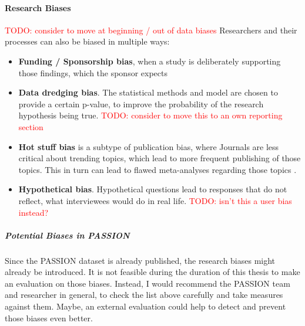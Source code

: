 \documentclass[12pt, a4paper, oneside]{book}   	%
\renewcommand{\todo}[1]{\textcolor{red}{TODO: #1}}
\begin{document}
			\paragraph{Research Biases}
			\todo{consider to move at beginning / out of data biases}
			Researchers and their processes can also be biased in multiple ways:
			\begin{itemize}
				\item \textbf{Funding / Sponsorship bias}, when a study is deliberately supporting those findings, which the sponsor expects \autocites{Chakraborty_2024, c22}{Mester_2017}
				
				\item \textbf{Data dredging bias}. The statistical methods and model are chosen to provide a certain p-value, to improve the probability of the research hypothesis being true. \todo{consider to move this to an own reporting section} \autocite{Chakraborty_2024}
				
				\item \textbf{Hot stuff bias} is a subtype of publication bias, where Journals are less critical about trending topics, which lead to more frequent publishing of those topics. This in turn can lead to flawed meta-analyses regarding those topics  \autocite{Chakraborty_2024, c22, c23, c19}.

				\item \textbf{Hypothetical bias}. Hypothetical questions lead to responses that do not reflect, what interviewees would do in real life. \autocite{Chakraborty_2024, c31, c28} \todo{isn't this a user bias instead?}
			\end{itemize}
			
			\subparagraph{Potential Biases in PASSION}
			Since the PASSION dataset is already published, the research biases might already be introduced. It is not feasible during the duration of this thesis to make an evaluation on those biases. Instead, I would recommend the PASSION team and researcher in general, to check the list above carefully and take measures against them. Maybe, an external evaluation could help to detect and prevent those biases even better.
			
			
			
\end{document}
